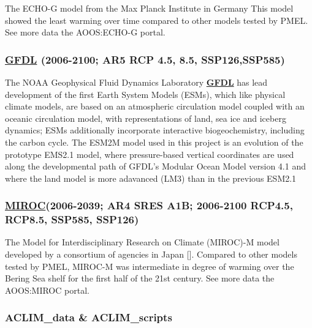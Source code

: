 \documentclass[
]{article}
\begin{document}
The ECHO-G model from the Max Planck Institute in Germany This model
showed the least warming over time compared to other models tested by
PMEL. See more data the AOOS:ECHO-G portal.

\hypertarget{gfdl-2006-2100-ar5-rcp-4.5-8.5-ssp126ssp585}{%
\subsubsection{\texorpdfstring{\href{http://www.gfdl.noaa.gov/earth-system-model}{GFDL}
(2006-2100; AR5 RCP 4.5, 8.5,
SSP126,SSP585)}{GFDL (2006-2100; AR5 RCP 4.5, 8.5, SSP126,SSP585)}}\label{gfdl-2006-2100-ar5-rcp-4.5-8.5-ssp126ssp585}}

The NOAA Geophysical Fluid Dynamics Laboratory
\href{http://www.gfdl.noaa.gov}{\textbf{GFDL}} has lead development of
the first Earth System Models (ESMs), which like physical climate
models, are based on an atmospheric circulation model coupled with an
oceanic circulation model, with representations of land, sea ice and
iceberg dynamics; ESMs additionally incorporate interactive
biogeochemistry, including the carbon cycle. The ESM2M model used in
this project is an evolution of the prototype EMS2.1 model, where
pressure-based vertical coordinates are used along the developmental
path of GFDL's Modular Ocean Model version 4.1 and where the land model
is more adavanced (LM3) than in the previous ESM2.1

\hypertarget{miroc2006-2039-ar4-sres-a1b-2006-2100-rcp4.5-rcp8.5-ssp585-ssp126}{%
\subsubsection{\texorpdfstring{\href{www.cger.nies.go.jp/publications/report/i073/I073.pdf}{MIROC}(2006-2039;
AR4 SRES A1B; 2006-2100 RCP4.5, RCP8.5, SSP585,
SSP126)}{MIROC(2006-2039; AR4 SRES A1B; 2006-2100 RCP4.5, RCP8.5, SSP585, SSP126)}}\label{miroc2006-2039-ar4-sres-a1b-2006-2100-rcp4.5-rcp8.5-ssp585-ssp126}}

The Model for Interdisciplinary Research on Climate (MIROC)-M model
developed by a consortium of agencies in Japan {[}{]}. Compared to other
models tested by PMEL, MIROC-M was intermediate in degree of warming
over the Bering Sea shelf for the first half of the 21st century. See
more data the AOOS:MIROC portal.

\hypertarget{aclim_data-aclim_scripts}{%
\subsubsection{ACLIM\_data \&
ACLIM\_scripts}\label{aclim_data-aclim_scripts}}
\end{document}

